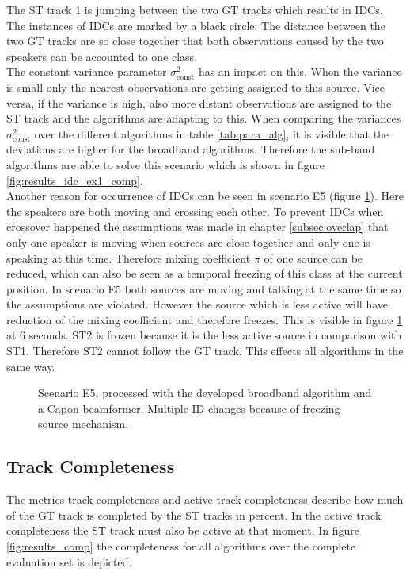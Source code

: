 The \ac{ST} track 1 is jumping between the two \ac{GT} tracks which results in \acp{IDC}. The instances of \acp{IDC} are marked by a black circle. The distance between the two \ac{GT} tracks are so close together that both observations caused by the two speakers can be accounted to one class. \\
The constant variance parameter $\sigma^2_\text{const}$ has an impact on this. When the variance is small only the nearest observations are getting assigned to this source. Vice versa, if the variance is high, also more distant observations are assigned to the \ac{ST} track and the algorithms are adapting to this. When comparing the variances $\sigma^2_\text{const}$ over the different algorithms in table \ref{tab:para_alg}, it is visible that the deviations are higher for the broadband algorithms. Therefore the sub-band algorithms are able to solve this scenario which is shown in figure \ref{fig:results_idc_ex1_comp}.
\\
Another reason for occurrence of \acp{IDC} can be seen in scenario E5 (figure \ref{fig:results_idc_ex2}). Here the speakers are both moving and crossing each other. To prevent \acp{IDC} when crossover happened the assumptions was made in chapter \ref{subsec:overlap} that only one speaker is moving when sources are close together and only one is speaking at this time. Therefore mixing coefficient $\pi$ of one source can be reduced, which can also be seen as a temporal freezing of this class at the current position. In scenario E5 both sources are moving and talking at the same time so the assumptions are violated. However the source which is less active will have reduction of the mixing coefficient and therefore freezes. This is visible in figure \ref{fig:results_idc_ex2} at 6 seconds. ST2 is frozen because it is the less active source in comparison with ST1. Therefore ST2 cannot follow the \ac{GT} track. This effects all algorithms in the same way.

\begin{figure}[!ht]
	\centering
		\def\svgwidth{1\linewidth}
		  \small
		\caption{Scenario E5, processed with the developed broadband algorithm and a Capon beamformer. Multiple ID changes because of freezing source mechanism.}
		\label{fig:results_idc_ex2}
\end{figure}

\subsection{Track Completeness}
\label{subsec:results_compl}
The metrics track completeness and active track completeness describe how much of the \ac{GT} track is completed by the \ac{ST} tracks in percent. In the active track completeness the \ac{ST} track must also be active at that moment. In figure \ref{fig:results_comp} the completeness for all algorithms over the complete evaluation set is depicted.

